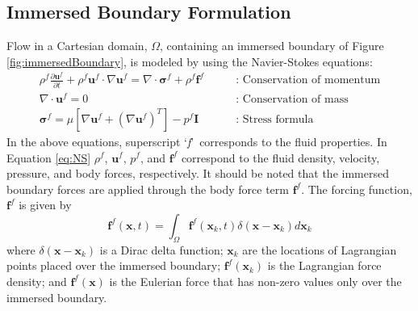 \documentclass[12pt]{aiaa-pretty}
\begin{document}
\subsection{Immersed Boundary Formulation}\label{subsec:IB}
Flow in a Cartesian domain, $\Omega$, containing an immersed boundary of Figure \eqref{fig:immersedBoundary}, is modeled by using the Navier-Stokes equations:
%
\begin{subequations}\label{eq:NS}
\begin{align}
	\rho^f \frac{\partial \mathbf{u}^f}{\partial t} + 
	\rho^f \mathbf{u}^f \cdot \nabla \mathbf{u}^f = 
	\nabla \cdot \mathbf{\sigma}^f +
	\rho^f \mathbf{f}^f
	\quad \quad &\text{: Conservation of momentum}
	\\
	\nabla \cdot \mathbf{u}^f = 0
	\quad \quad &\text{: Conservation of mass}
	\\
	\mathbf{\sigma}^f = 
	\mu \left[ \nabla \mathbf{u}^f + \left( \nabla \mathbf{u}^f \right)^T \right] - 
	p^f \mathbf{I}
	\quad \quad &\text{: Stress formula}
\end{align}
\end{subequations}
%
In the above equations, superscript \lq\emph{f}\rq\ corresponds to the fluid properties. In Equation \eqref{eq:NS} $\rho^f$, $\mathbf{u}^f$, $p^f$, and $\mathbf{f}^f$ correspond to the fluid density, velocity, pressure, and body forces, respectively. It should be noted that the immersed boundary forces are applied through the body force term $\mathbf{f}^f$. The forcing function, $\mathbf{f}^f$ is given by
%
\begin{equation}\label{eq:forceAtEulerian}
	\mathbf{f}^f(\mathbf{x}, t) = \int_\Omega \mathbf{f}^f (\mathbf{x}_k, t) \delta(\mathbf{x} - \mathbf{x}_k) d\mathbf{x}_k
\end{equation}
%
where $\delta(\mathbf{x} - \mathbf{x}_k)$ is a Dirac delta function; $\mathbf{x}_k$ are the locations of Lagrangian points placed over the immersed boundary; $\mathbf{f}^f(\mathbf{x}_k)$ is the Lagrangian force density; and $\mathbf{f}^f(\mathbf{x})$ is the Eulerian force that has non-zero values only over the immersed boundary.
\end{document}
